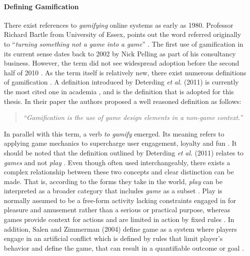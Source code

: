 \paragraph{Defining Gamification}
There exist references to \textit{gamifying} online systems as early as 1980. Professor Richard Bartle from University of Essex, points out the word referred originally to ``\textit{turning something not a game into a game}'' \cite{werbach2012win}. The first use of gamification in its current sense dates back to 2002 by Nick Pelling as part of his consultancy business. However, the term did not see widespread adoption before the second half of 2010 \cite{marczewski2013gamification}. As  the  term  itself  is  relatively  new,  there  exist  numerous definitions  of  gamification \cite{werbach2012win, deterding2011game, kapp2012gamification}. A definition introduced by Deterding \textit{et al.} (2011) is currently the most cited one in academia \cite{deterding2011game}, and is the definition that is adopted for this thesis. In their paper the authors proposed a well reasoned definition as follows:
\begin{quotation}
\textit{``Gamification is the use of game design elements in a non-game context.''}
\end{quotation}
In parallel with this term, a verb \textit{to gamify} emerged. Its meaning refers to applying game mechanics to supercharge user engagement, loyalty and fun \cite{toGamify}. 
It should be noted that the definition outlined by Deterding \textit{et al.} (2011) relates to \textit{games} and not \textit{play} \cite{deterding2011game}. %
Even though often used interchangeably, there exists a complex relationship between these two concepts and clear distinction can be made. That is, according to the forms they take in the world, \textit{play} can be interpreted as a broader category that includes \textit{game} as a subset \cite{salen2004rules}. Play is normally assumed to be a free-form activity lacking constraints engaged in for pleasure and amusement rather than a serious or practical purpose, whereas games provide context for actions and are limited in action by fixed rules \cite{juul2011half}. In addition, Salen and Zimmerman (2004) define game as a system where players engage in an artificial conflict which is defined by rules that limit player's behavior and define the game, that can result in a quantifiable outcome or goal \cite{salen2004rules}. %
